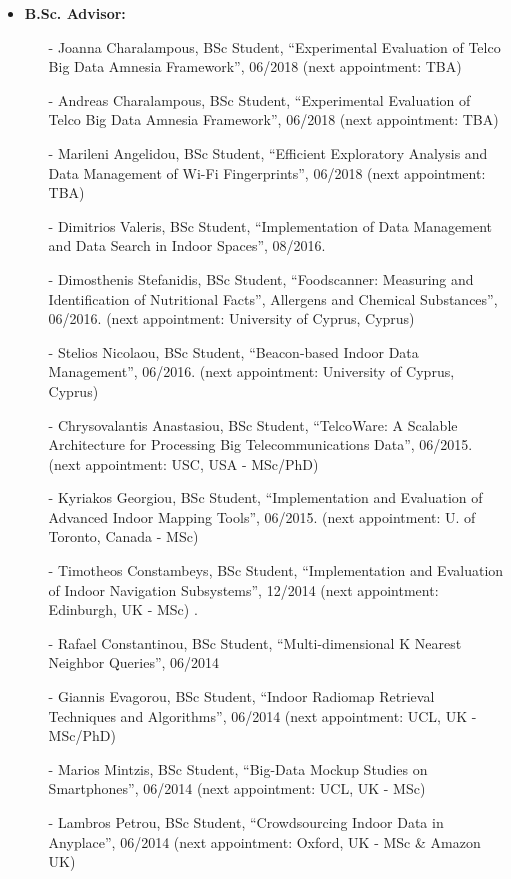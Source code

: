 \documentclass[10pt]{article}
\begin{document}
\begin{itemize}
    \item {\bf B.Sc. Advisor:} 
	\begin{itemize}
		\setlength{\itemsep}{0.10ex}
         \item[-] Joanna Charalampous, BSc Student, ``Experimental Evaluation of Telco Big Data Amnesia Framework'',  06/2018 (next appointment: TBA)
         \item[-] Andreas Charalampous, BSc Student, ``Experimental Evaluation of Telco Big Data Amnesia Framework'',  06/2018 (next appointment: TBA)
         \item[-] Marileni Angelidou, BSc Student, ``Efficient Exploratory Analysis and Data Management of Wi-Fi Fingerprints'',  06/2018 (next appointment: TBA)
         \item[-] Dimitrios Valeris, BSc Student, ``Implementation of Data Management and Data Search in Indoor Spaces'',  08/2016.
         \item[-] Dimosthenis Stefanidis, BSc Student, ``Foodscanner: Measuring and Identification of Nutritional Facts'', Allergens and Chemical Substances'',  06/2016. (next appointment: University of Cyprus, Cyprus)
         \item[-] Stelios Nicolaou, BSc Student, ``Beacon-based Indoor Data Management'',  06/2016. (next appointment: University of Cyprus, Cyprus)
         \item[-] Chrysovalantis Anastasiou, BSc Student, ``TelcoWare: A Scalable Architecture for Processing Big Telecommunications Data'',  06/2015. (next appointment: USC, USA - MSc/PhD)
         \item[-] Kyriakos Georgiou, BSc Student, ``Implementation and Evaluation of Advanced Indoor Mapping Tools'',  06/2015. (next appointment: U. of Toronto, Canada - MSc)
        \item[-] Timotheos Constambeys, BSc Student, ``Implementation and Evaluation of Indoor Navigation Subsystems'',  12/2014 (next appointment: Edinburgh, UK - MSc)
.
         \item[-] Rafael Constantinou, BSc Student, ``Multi-dimensional K Nearest Neighbor Queries'',  06/2014
         \item[-] Giannis Evagorou, BSc Student, ``Indoor Radiomap Retrieval Techniques and Algorithms'',  06/2014 (next appointment: UCL, UK - MSc/PhD)
         \item[-] Marios Mintzis, BSc Student, ``Big-Data Mockup Studies on Smartphones'',  06/2014 (next appointment: UCL, UK - MSc)
         \item[-] Lambros Petrou, BSc Student, ``Crowdsourcing Indoor Data in Anyplace'',  06/2014 (next appointment: Oxford, UK - MSc \& Amazon UK)

\end{itemize}
\end{itemize}
\end{document}

